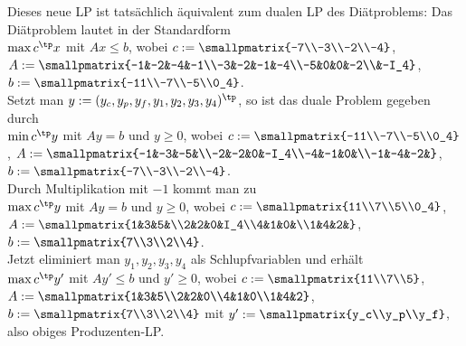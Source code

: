 Dieses neue LP ist tatsächlich äquivalent zum dualen LP des Diätproblems:
Das Diätproblem lautet in der Standardform\\
$\max c^\tp x$ mit $Ax \le b$, wobei
$c := \smallpmatrix{-7\\-3\\-2\\-4}$,
$A := \smallpmatrix{-1&-2&-4&-1\\-3&-2&-1&-4\\-5&0&0&-2\\&-I_4}$,
$b := \smallpmatrix{-11\\-7\\-5\\0_4}$.\\
Setzt man $y := (y_c, y_p, y_f, y_1, y_2, y_3, y_4)^\tp$, so ist das duale Problem gegeben durch\\
$\min c^\tp y$ mit $Ay = b$ und $y \ge 0$, wobei
$c := \smallpmatrix{-11\\-7\\-5\\0_4}$,
$A := \smallpmatrix{-1&-3&-5&\\-2&-2&0&-I_4\\-4&-1&0&\\-1&-4&-2&}$,
$b := \smallpmatrix{-7\\-3\\-2\\-4}$.\\
Durch Multiplikation mit $-1$ kommt man zu\\
$\max c^\tp y$ mit $Ay = b$ und $y \ge 0$, wobei
$c := \smallpmatrix{11\\7\\5\\0_4}$,
$A := \smallpmatrix{1&3&5&\\2&2&0&I_4\\4&1&0&\\1&4&2&}$,
$b := \smallpmatrix{7\\3\\2\\4}$.\\
Jetzt eliminiert man $y_1, y_2, y_3, y_4$ als Schlupfvariablen und erhält\\
$\max c^\tp y'$ mit $Ay' \le b$ und $y' \ge 0$, wobei
$c := \smallpmatrix{11\\7\\5}$,
$A := \smallpmatrix{1&3&5\\2&2&0\\4&1&0\\1&4&2}$,
$b := \smallpmatrix{7\\3\\2\\4}$ mit
$y' := \smallpmatrix{y_c\\y_p\\y_f}$,\\
also obiges Produzenten-LP.

